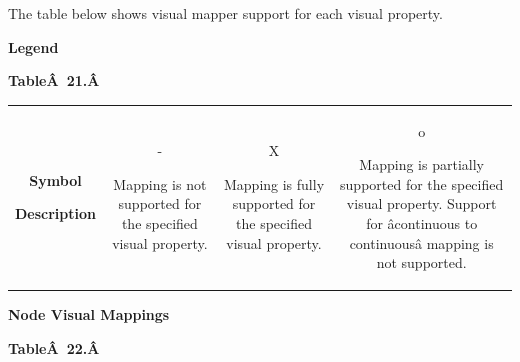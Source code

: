  The table below shows visual mapper support for each visual property. 


 \textbf{Legend}



 \textbf{Table\^A 21.\^A }



\begin{tabular}{|c|c|c|c|}
\hline 
 & & & \\
 \hline 


 \textbf{Symbol}



 \textbf{Description}

 &

  - 


 Mapping is not supported for the specified visual property. 
 &

  X 


 Mapping is fully supported for the specified visual property. 
 &

  o 


 Mapping is partially supported for the specified visual property. Support for \^acontinuous to continuous\^a mapping is not supported. 
 \\
 \hline 

\end{tabular}



 \textbf{Node Visual Mappings}



 \textbf{Table\^A 22.\^A }



